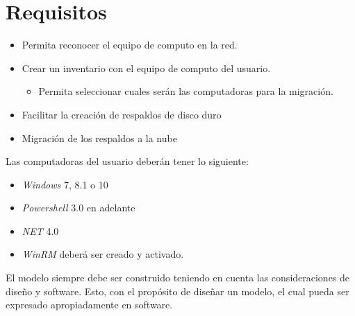 \documentclass[12pt,twoside]{reedthesis}
\providecommand{\tightlist}{%
  \setlength{\itemsep}{0pt}\setlength{\parskip}{0pt}}
\theoremstyle{definition}
\theoremstyle{definition}
\theoremstyle{definition}
\theoremstyle{remark}
\begin{document}
\hypertarget{requisitos}{%
\section{Requisitos}\label{requisitos}}
\begin{itemize}
\tightlist
\item
  Permita reconocer el equipo de computo en la red.
\item
  Crear un inventario con el equipo de computo del usuario.
  \begin{itemize}
  \tightlist
  \item
    Permita seleccionar cuales serán las computadoras para la migración.
  \end{itemize}
\item
  Facilitar la creación de respaldos de disco duro
\item
  Migración de los respaldos a la nube
\end{itemize}
Las computadoras del usuario deberán tener lo siguiente:
\begin{itemize}
\tightlist
\item
  \emph{Windows} 7, 8.1 o 10
\item
  \emph{Powershell} 3.0 en adelante
\item
  \emph{NET} 4.0
\item
  \emph{WinRM} deberá ser creado y activado.
\end{itemize}
El modelo siempre debe ser construido teniendo en cuenta las
consideraciones de diseño y software. Esto, con el propósito de diseñar
un modelo, el cual pueda ser expresado apropiadamente en software.
\end{document}
